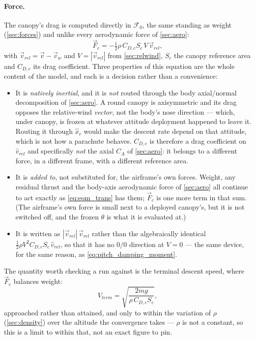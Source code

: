 \paragraph{Force.} The canopy's drag is computed directly in $\mathcal{F}_0$, the same standing as
weight (\autoref{sec:forces}) and unlike every aerodynamic force of \autoref{sec:aero}:
\begin{equation} \label{eq:chute_force}
    \vec{F}_c = -\tfrac12\rho\,C_{D,c}S_c\,V\,\vec{v}_{rel},
\end{equation}
with $\vec{v}_{rel}=\vec{v}-\vec{v}_w$ and $V=|\vec{v}_{rel}|$ from \autoref{sec:relwind}, $S_c$
the canopy reference area and $C_{D,c}$ its drag coefficient. Three properties of this equation are
the whole content of the model, and each is a decision rather than a convenience:
\begin{itemize}
    \item It is \emph{natively inertial}, and it is \emph{not} routed through the body
    axial/normal decomposition of \autoref{sec:aero}. A round canopy is axisymmetric and its drag
    opposes the relative-wind \emph{vector}, not the body's nose direction --- which, under canopy,
    is frozen at whatever attitude deployment happened to leave it. Routing it through
    $\hat{x}_r$ would make the descent rate depend on that attitude, which is not how a parachute
    behaves. $C_{D,c}$ is therefore a drag coefficient on $\hat{v}_{rel}$ and specifically
    \emph{not} the axial $C_A$ of \autoref{sec:aero}: it belongs to a different force, in a
    different frame, with a different reference area.
    \item It is \emph{added to}, not substituted for, the airframe's own forces. Weight, any
    residual thrust and the body-axis aerodynamic force of \autoref{sec:aero} all continue to act
    exactly as \autoref{eq:eom_trans} has them; $\vec{F}_c$ is one more term in that sum. (The
    airframe's own force is small next to a deployed canopy's, but it is not switched off, and the
    frozen $\theta$ is what it is evaluated at.)
    \item It is written as $|\vec{v}_{rel}|\,\vec{v}_{rel}$ rather than the algebraically identical
    $\tfrac12\rho V^2C_{D,c}S_c\,\hat{v}_{rel}$, so that it has no $0/0$ direction at $V=0$ --- the
    same device, for the same reason, as \autoref{eq:pitch_damping_moment}.
\end{itemize}
The quantity worth checking a run against is the terminal descent speed, where $\vec{F}_c$ balances
weight:
\begin{equation} \label{eq:chute_terminal}
    V_{term} = \sqrt{\frac{2mg}{\rho\,C_{D,c}S_c}},
\end{equation}
approached rather than attained, and only to within the variation of $\rho$
(\autoref{sec:density}) over the altitude the convergence takes --- $\rho$ is not a constant, so
this is a limit to within that, not an exact figure to pin.

